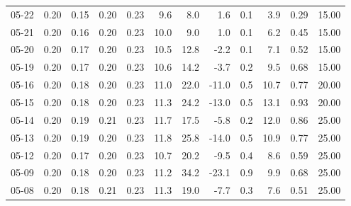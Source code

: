 \begin{threeparttable}
{\begin{tabular}{lrrrrrrrrrrr}
  05-22 &          0.20 &          0.15 &          0.20 &        0.23 &                 9.6 &                 8.0 &        1.6 &                 0.1 &              3.9 &            0.29 &                  15.00 \\
  05-21 &          0.20 &          0.16 &          0.20 &        0.23 &                10.0 &                 9.0 &        1.0 &                 0.1 &              6.2 &            0.45 &                  15.00 \\
  05-20 &          0.20 &          0.17 &          0.20 &        0.23 &                10.5 &                12.8 &       -2.2 &                 0.1 &              7.1 &            0.52 &                  15.00 \\
  05-19 &          0.20 &          0.17 &          0.20 &        0.23 &                10.6 &                14.2 &       -3.7 &                 0.2 &              9.5 &            0.68 &                  15.00 \\
  05-16 &          0.20 &          0.18 &          0.20 &        0.23 &                11.0 &                22.0 &      -11.0 &                 0.5 &             10.7 &            0.77 &                  20.00 \\
  05-15 &          0.20 &          0.18 &          0.20 &        0.23 &                11.3 &                24.2 &      -13.0 &                 0.5 &             13.1 &            0.93 &                  20.00 \\
  05-14 &          0.20 &          0.19 &          0.21 &        0.23 &                11.7 &                17.5 &       -5.8 &                 0.2 &             12.0 &            0.86 &                  25.00 \\
  05-13 &          0.20 &          0.19 &          0.20 &        0.23 &                11.8 &                25.8 &      -14.0 &                 0.5 &             10.9 &            0.77 &                  25.00 \\
  05-12 &          0.20 &          0.17 &          0.20 &        0.23 &                10.7 &                20.2 &       -9.5 &                 0.4 &              8.6 &            0.59 &                  25.00 \\
  05-09 &          0.20 &          0.18 &          0.20 &        0.23 &                11.2 &                34.2 &      -23.1 &                 0.9 &              9.9 &            0.68 &                  25.00 \\
  05-08 &          0.20 &          0.18 &          0.21 &        0.23 &                11.3 &                19.0 &       -7.7 &                 0.3 &              7.6 &            0.51 &                  25.00 \\

\end{tabular}}
\end{threeparttable}
